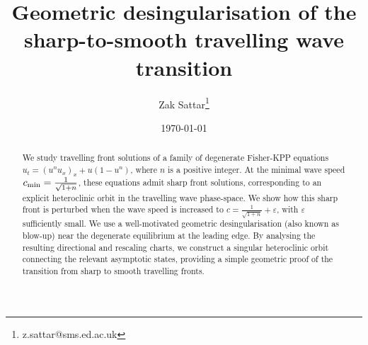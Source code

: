 \documentclass{article}
\theoremstyle{definition}
\numberwithin{equation}{section}
\begin{document}
\title{Geometric desingularisation of the sharp-to-smooth travelling wave transition}

\author{Zak Sattar\thanks{z.sattar@sms.ed.ac.uk}}


\date{\today}

\maketitle





\begin{abstract}
\noindent
We study travelling front solutions of a family of degenerate Fisher-KPP equations $u_t=(u^n u_x)_x+u(1-u^n)$, where $n$ is a positive integer. At the minimal wave speed $c_{\rm min}=\tfrac{1}{\sqrt{1+n}}$, these equations admit  sharp front solutions, corresponding to an explicit heteroclinic orbit in the travelling wave phase-space. We show how this sharp front is perturbed when the wave speed is increased to $c=\tfrac{1}{\sqrt{1+n}}+\varepsilon$, with $\varepsilon$ sufficiently small.  We use a well-motivated geometric desingularisation (also known as blow-up) near the degenerate equilibrium at the leading edge. By analysing the resulting directional and rescaling charts, we construct a singular heteroclinic orbit connecting the relevant asymptotic states, providing a simple geometric proof of the transition from sharp to smooth travelling fronts.

\end{abstract}

\end{document}
